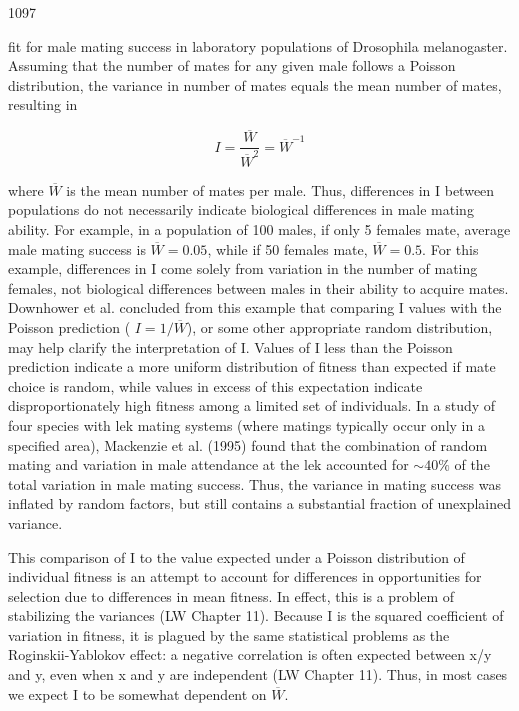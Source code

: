 \documentclass{article}
\begin{document}
1097

fit for male mating success in laboratory populations of Drosophila melanogaster. Assuming that the number of mates for any given male follows a Poisson distribution, the variance in number of mates equals the mean number of mates, resulting in

\begin{equation}
I=\frac{\overline{W}}{\overline{W}^{2}}=\overline{W}^{-1}
\end{equation}

where  $ \overline{W} $ is the mean number of mates per male. Thus, differences in I between populations do not necessarily indicate biological differences in male mating ability. For example, in a population of 100 males, if only 5 females mate, average male mating success is  $ \overline{W} = 0.05 $, while if 50 females mate,  $ \overline{W} = 0.5 $. For this example, differences in I come solely from variation in the number of mating females, not biological differences between males in their ability to acquire mates. Downhower et al. concluded from this example that comparing I values with the Poisson prediction ( $ I = 1/\overline{W} $), or some other appropriate random distribution, may help clarify the interpretation of I. Values of I less than the Poisson prediction indicate a more uniform distribution of fitness than expected if mate choice is random, while values in excess of this expectation indicate disproportionately high fitness among a limited set of individuals. In a study of four species with lek mating systems (where matings typically occur only in a specified area), Mackenzie et al. (1995) found that the combination of random mating and variation in male attendance at the lek accounted for  $ \sim40\% $ of the total variation in male mating success. Thus, the variance in mating success was inflated by random factors, but still contains a substantial fraction of unexplained variance.

This comparison of I to the value expected under a Poisson distribution of individual fitness is an attempt to account for differences in opportunities for selection due to differences in mean fitness. In effect, this is a problem of stabilizing the variances (LW Chapter 11). Because I is the squared coefficient of variation in fitness, it is plagued by the same statistical problems as the Roginskii-Yablokov effect: a negative correlation is often expected between x/y and y, even when x and y are independent (LW Chapter 11). Thus, in most cases we expect I to be somewhat dependent on  $ \overline{W} $.
\end{document}
